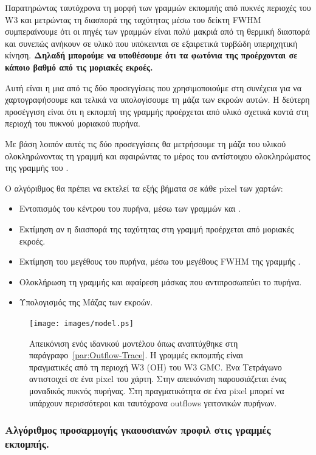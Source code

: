\documentclass[a4paper,12pt]{memoir}
\begin{document}
Παρατηρώντας ταυτόχρονα τη μορφή των γραμμών εκπομπής από πυκνές περιοχές του W3 και μετρώντας τη διασπορά της ταχύτητας μέσω του δείκτη FWHM συμπεραίνουμε ότι οι πηγές των γραμμών  είναι πολύ μακριά από τη θερμική διασπορά και συνεπώς ανήκουν σε υλικό που υπόκεινται σε εξαιρετικά τυρβώδη υπερηχητική κίνηση. \textbf{Δηλαδή μπορούμε να υποθέσουμε ότι τα φωτόνια της  προέρχονται σε κάποιο βαθμό από τις μοριακές εκροές.}
 
Αυτή είναι η μια από τις δύο προσεγγίσεις που χρησιμοποιούμε στη συνέχεια για να χαρτογραφήσουμε και τελικά να υπολογίσουμε τη μάζα των εκροών αυτών. Η δεύτερη προσέγγιση είναι ότι η εκπομπή της γραμμής  προέρχεται από υλικό σχετικά κοντά στη περιοχή του πυκνού μοριακού πυρήνα. 

Με βάση λοιπόν αυτές τις δύο προσεγγίσεις θα μετρήσουμε τη μάζα του υλικού ολοκληρώνοντας τη γραμμή  και αφαιρώντας το μέρος του αντίστοιχου ολοκληρώματος της γραμμής του .

Ο αλγόριθμος θα πρέπει να εκτελεί τα εξής βήματα σε κάθε pixel των χαρτών:
\begin{itemize}
	\item Εντοπισμός του κέντρου του πυρήνα, μέσω των γραμμών  και .
	\item Εκτίμηση αν η διασπορά της ταχύτητας στη γραμμή  προέρχεται από μοριακές εκροές.
	\item Εκτίμηση του μεγέθους του πυρήνα, μέσω του μεγέθους FWHM της γραμμής .
	\item Ολοκλήρωση τη γραμμής  και αφαίρεση μάσκας που αντιπροσωπεύει το πυρήνα. 
	\item Υπολογισμός της Μάζας των εκροών. 
\end{itemize}

\begin{figure}[H]
	\centering
	\texttt{[image: images/model.ps]}
	\caption{Απεικόνιση ενός ιδανικού μοντέλου όπως αναπτύχθηκε στη παράγραφο~\ref{par:Outflow-Trace}. Η γραμμές εκπομπής είναι πραγματικές από τη περιοχή W3 (OH) του W3 GMC. Ένα Τετράγωνο αντιστοιχεί σε ένα pixel του χάρτη. Στην απεικόνιση παρουσιάζεται ένας μοναδικός πυκνός πυρήνας. Στη πραγματικότητα σε ένα pixel μπορεί να υπάρχουν περισσότεροι και ταυτόχρονα outflows γειτονικών πυρήνων.}
\end{figure}


\subsubsection{Αλγόριθμος προσαρμογής γκαουσιανών προφιλ στις γραμμές εκπομπής.}
\end{document}
